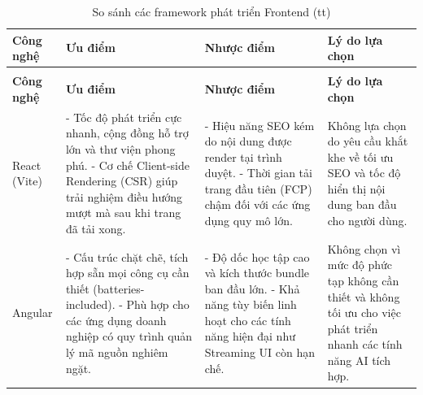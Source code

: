 \begin{center}
    \renewcommand{\arraystretch}{1.5}
    \begin{longtable}{|p{2.5cm}|p{4cm}|p{4cm}|p{3.5cm}|}
        \caption{So sánh các framework phát triển Frontend} \label{tab:frontend_framework_comparison}                                                                                                                       \\
        \hline
        \centering\textbf{Công nghệ}                                                                        & \centering\textbf{Ưu điểm} & \centering\textbf{Nhược điểm} & \centering\arraybackslash\textbf{Lý do lựa chọn} \\ \hline
        \endfirsthead

        \caption[]{So sánh các framework phát triển Frontend (tt)}                                                                                                                                                          \\ \hline
        \centering\textbf{Công nghệ}                                                                        & \centering\textbf{Ưu điểm} & \centering\textbf{Nhược điểm} & \centering\arraybackslash\textbf{Lý do lựa chọn} \\ \hline
        \endhead

        React (Vite)                                                                                        &
        - Tốc độ phát triển cực nhanh, cộng đồng hỗ trợ lớn và thư viện phong phú. \newline
        - Cơ chế Client-side Rendering (CSR) giúp trải nghiệm điều hướng mượt mà sau khi trang đã tải xong. &
        - Hiệu năng SEO kém do nội dung được render tại trình duyệt. \newline
        - Thời gian tải trang đầu tiên (FCP) chậm đối với các ứng dụng quy mô lớn.                          &
        Không lựa chọn do yêu cầu khắt khe về tối ưu SEO và tốc độ hiển thị nội dung ban đầu cho người dùng.                                                                                                                \\ \hline

        Angular                                                                                             &
        - Cấu trúc chặt chẽ, tích hợp sẵn mọi công cụ cần thiết (batteries-included). \newline
        - Phù hợp cho các ứng dụng doanh nghiệp có quy trình quản lý mã nguồn nghiêm ngặt.                  &
        - Độ dốc học tập cao và kích thước bundle ban đầu lớn. \newline
        - Khả năng tùy biến linh hoạt cho các tính năng hiện đại như Streaming UI còn hạn chế.              &
        Không chọn vì mức độ phức tạp không cần thiết và không tối ưu cho việc phát triển nhanh các tính năng AI tích hợp.                                                                                                  \\ \hline


\end{longtable}
\end{center}
